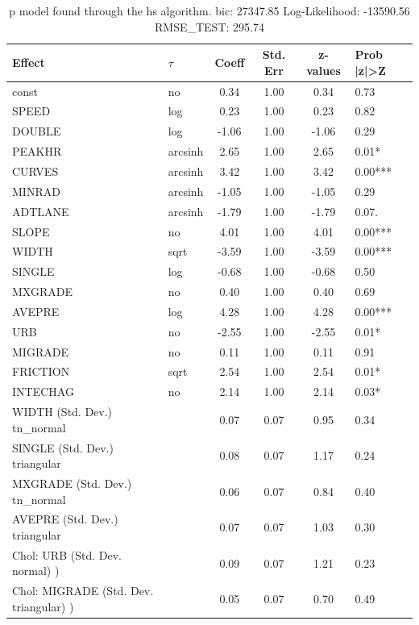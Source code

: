 \begin{table}
	\caption{p model found through the hs algorithm. bic: 27347.85 Log-Likelihood: -13590.56 RMSE_TEST: 295.74}
	\begin{center}
		\begin{tabular}{|l|l|c|c|c|l|}
			\hline
			Effect & $\tau$ & Coeff & Std. Err & z-values & Prob |z|>Z \\
			\hline
			const & no & 0.34 & 1.00 & 0.34 & 0.73 \\
			\hline
			SPEED & log & 0.23 & 1.00 & 0.23 & 0.82 \\
			\hline
			DOUBLE & log & -1.06 & 1.00 & -1.06 & 0.29 \\
			\hline
			PEAKHR & arcsinh & 2.65 & 1.00 & 2.65 & 0.01* \\
			\hline
			CURVES & arcsinh & 3.42 & 1.00 & 3.42 & 0.00*** \\
			\hline
			MINRAD & arcsinh & -1.05 & 1.00 & -1.05 & 0.29 \\
			\hline
			ADTLANE & arcsinh & -1.79 & 1.00 & -1.79 & 0.07. \\
			\hline
			SLOPE & no & 4.01 & 1.00 & 4.01 & 0.00*** \\
			\hline
			WIDTH & sqrt & -3.59 & 1.00 & -3.59 & 0.00*** \\
			\hline
			SINGLE & log & -0.68 & 1.00 & -0.68 & 0.50 \\
			\hline
			MXGRADE & no & 0.40 & 1.00 & 0.40 & 0.69 \\
			\hline
			AVEPRE & log & 4.28 & 1.00 & 4.28 & 0.00*** \\
			\hline
			URB & no & -2.55 & 1.00 & -2.55 & 0.01* \\
			\hline
			MIGRADE & no & 0.11 & 1.00 & 0.11 & 0.91 \\
			\hline
			FRICTION & sqrt & 2.54 & 1.00 & 2.54 & 0.01* \\
			\hline
			INTECHAG & no & 2.14 & 1.00 & 2.14 & 0.03* \\
			\hline
			WIDTH (Std. Dev.) tn_normal &  & 0.07 & 0.07 & 0.95 & 0.34 \\
			\hline
			SINGLE (Std. Dev.) triangular &  & 0.08 & 0.07 & 1.17 & 0.24 \\
			\hline
			MXGRADE (Std. Dev.) tn_normal &  & 0.06 & 0.07 & 0.84 & 0.40 \\
			\hline
			AVEPRE (Std. Dev.) triangular &  & 0.07 & 0.07 & 1.03 & 0.30 \\
			\hline
			 Chol: URB (Std. Dev. normal) ) &  & 0.09 & 0.07 & 1.21 & 0.23 \\
			\hline
			 Chol: MIGRADE (Std. Dev. triangular) ) &  & 0.05 & 0.07 & 0.70 & 0.49 \\

\end{tabular}
\end{center}
\end{table}
